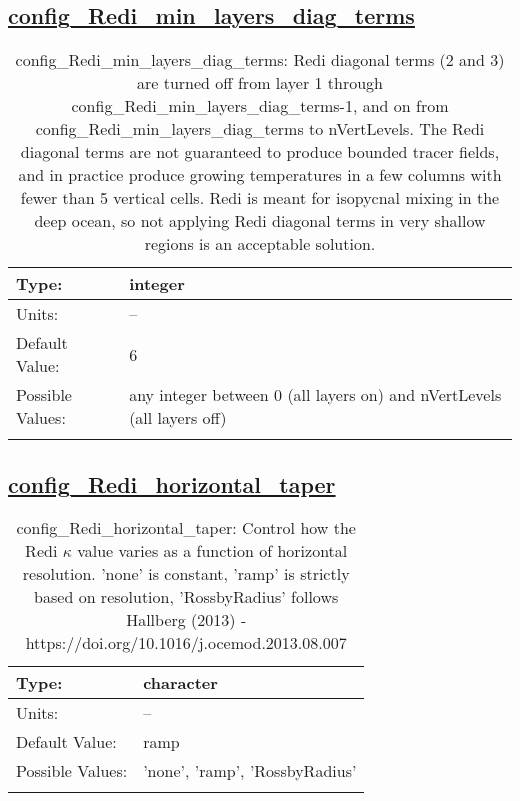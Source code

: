 \subsection[config\_Redi\_min\_layers\_diag\_terms]{\hyperref[sec:nm_tab_Redi_isopycnal_mixing]{config\_Redi\_min\_layers\_diag\_terms}}
\label{subsec:nm_sec_config_Redi_min_layers_diag_terms}
\begin{center}
\begin{longtable}{| p{2.0in} || p{4.0in} |}
    \hline
    Type: & integer \\
    \hline
    Units: & -- \\
    \hline
    Default Value: & 6 \\
    \hline
    Possible Values: & any integer between 0 (all layers on) and nVertLevels (all layers off) \\
    \hline
    \caption{config\_Redi\_min\_layers\_diag\_terms: Redi diagonal terms (2 and 3) are turned off from layer 1 through config\_Redi\_min\_layers\_diag\_terms-1, and on from config\_Redi\_min\_layers\_diag\_terms to nVertLevels. The Redi diagonal terms are not guaranteed to produce bounded tracer fields, and in practice produce growing temperatures in a few columns with fewer than 5 vertical cells. Redi is meant for isopycnal mixing in the deep ocean, so not applying Redi diagonal terms in very shallow regions is an acceptable solution.}
\end{longtable}
\end{center}
\subsection[config\_Redi\_horizontal\_taper]{\hyperref[sec:nm_tab_Redi_isopycnal_mixing]{config\_Redi\_horizontal\_taper}}
\label{subsec:nm_sec_config_Redi_horizontal_taper}
\begin{center}
\begin{longtable}{| p{2.0in} || p{4.0in} |}
    \hline
    Type: & character \\
    \hline
    Units: & -- \\
    \hline
    Default Value: & ramp \\
    \hline
    Possible Values: & 'none', 'ramp', 'RossbyRadius' \\
    \hline
    \caption{config\_Redi\_horizontal\_taper: Control how the Redi $\kappa$ value varies as a function of horizontal resolution. 'none' is constant, 'ramp' is strictly based on resolution, 'RossbyRadius' follows Hallberg (2013) - https://doi.org/10.1016/j.ocemod.2013.08.007}
\end{longtable}
\end{center}
